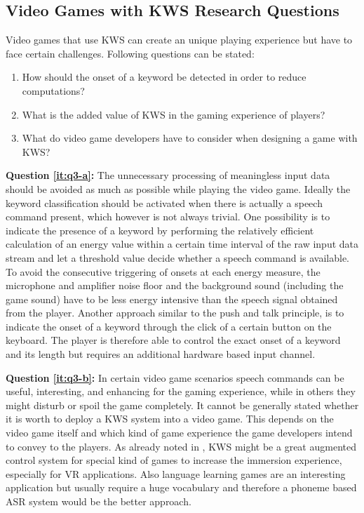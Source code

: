 \subsection{Video Games with KWS Research Questions}\label{sec:intro_rq_games}
Video games that use KWS can create an unique playing experience but have to face certain challenges.
Following questions can be stated:
\begin{enumerate}[label={Q.3.\alph*)}, leftmargin=1.75cm]
  \item How should the onset of a keyword be detected in order to reduce computations?\label{it:q3-a}
  \item What is the added value of KWS in the gaming experience of players?\label{it:q3-b}
  \item What do video game developers have to consider when designing a game with KWS?\label{it:q3-c}
\end{enumerate}
\noindent
\textbf{Question \ref{it:q3-a}:} 
The unnecessary processing of meaningless input data should be avoided as much as possible while playing the video game.
Ideally the keyword classification should be activated when there is actually a speech command present, which however is not always trivial.
One possibility is to indicate the presence of a keyword by performing the relatively efficient calculation of an energy value within a certain time interval of the raw input data stream and let a threshold value decide whether a speech command is available.
To avoid the consecutive triggering of onsets at each energy measure, the microphone and amplifier noise floor and the background sound (including the game sound) have to be less energy intensive than the speech signal obtained from the player.
Another approach similar to the push and talk principle, is to indicate the onset of a keyword through the click of a certain button on the keyboard.
The player is therefore able to control the exact onset of a keyword and its length but requires an additional hardware based input channel.

\textbf{Question \ref{it:q3-b}:}
In certain video game scenarios speech commands can be useful, interesting, and enhancing for the gaming experience, while in others they might disturb or spoil the game completely.
It cannot be generally stated whether it is worth to deploy a KWS system into a video game.
This depends on the video game itself and which kind of game experience the game developers intend to convey to the players.
As already noted in , KWS might be a great augmented control system for special kind of games to increase the immersion experience, especially for VR applications.
Also language learning games are an interesting application but usually require a huge vocabulary and therefore a phoneme based ASR system would be the better approach.


